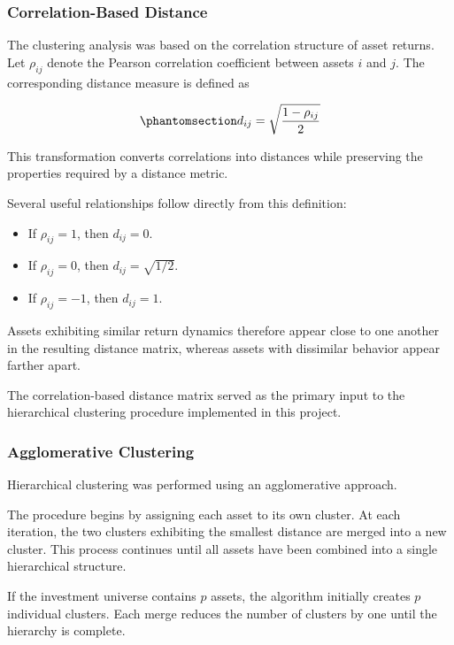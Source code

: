 \documentclass[
  12pt,
  letterpaper,
]{book}
\providecommand{\tightlist}{%
  \setlength{\itemsep}{0pt}\setlength{\parskip}{0pt}}
\begin{document}
\subsubsection{Correlation-Based
Distance}\label{correlation-based-distance}

The clustering analysis was based on the correlation structure of asset
returns. Let \(\rho_{ij}\) denote the Pearson correlation coefficient
between assets \(i\) and \(j\). The corresponding distance measure is
defined as

\begin{equation}\phantomsection\label{eq-correlation-distance}{
d_{ij} = \sqrt{\frac{1-\rho_{ij}}{2}}
}\end{equation}

This transformation converts correlations into distances while
preserving the properties required by a distance metric.

Several useful relationships follow directly from this definition:

\begin{itemize}
\tightlist
\item
  If \(\rho_{ij}=1\), then \(d_{ij}=0\).
\item
  If \(\rho_{ij}=0\), then \(d_{ij}=\sqrt{1/2}\).
\item
  If \(\rho_{ij}=-1\), then \(d_{ij}=1\).
\end{itemize}

Assets exhibiting similar return dynamics therefore appear close to one
another in the resulting distance matrix, whereas assets with dissimilar
behavior appear farther apart.

The correlation-based distance matrix served as the primary input to the
hierarchical clustering procedure implemented in this project.

\subsubsection{Agglomerative Clustering}\label{agglomerative-clustering}

Hierarchical clustering was performed using an agglomerative approach.

The procedure begins by assigning each asset to its own cluster. At each
iteration, the two clusters exhibiting the smallest distance are merged
into a new cluster. This process continues until all assets have been
combined into a single hierarchical structure.

If the investment universe contains \(p\) assets, the algorithm
initially creates \(p\) individual clusters. Each merge reduces the
number of clusters by one until the hierarchy is complete.
\end{document}
